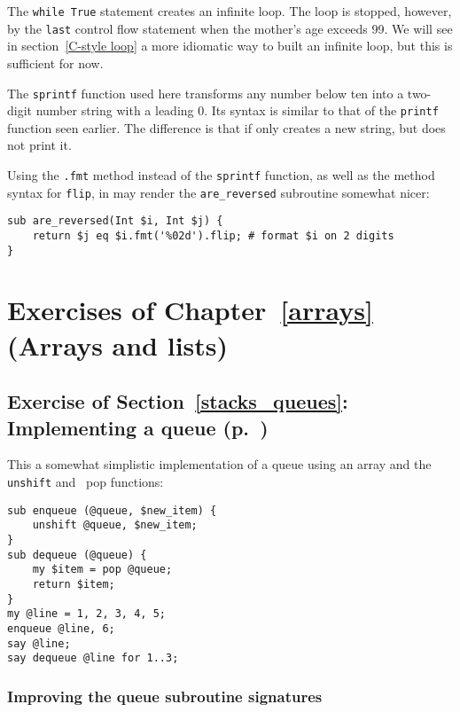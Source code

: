 The {\tt while True} statement creates an infinite loop. The 
loop is stopped, however, by the {\tt last} control flow 
statement when the mother's age exceeds 99. We will see 
in section~\ref{C-style loop} a more idiomatic way to built 
an infinite loop, but this is sufficient for now.

The {\tt sprintf} function used here transforms any number 
below ten into a two-digit number string with a leading 0. 
Its syntax is similar to that of the {\tt printf} function 
seen earlier. The difference is that if only creates a new 
string, but does not print it.

Using the \verb'.fmt' method instead of the {\tt sprintf} 
function, as well as the method syntax for {\tt flip}, in 
may render the \verb'are_reversed' subroutine somewhat  
nicer:

\begin{verbatim}
sub are_reversed(Int $i, Int $j) {
    return $j eq $i.fmt('%02d').flip; # format $i on 2 digits
}
\end{verbatim}


\section{Exercises of Chapter~\ref{arrays} (Arrays and lists)}

\subsection{Exercise of Section~\ref{stacks_queues}: Implementing a queue (p.~\pageref{exercise_queue})}
\label{sol_exercise_queue}

This a somewhat simplistic implementation of a queue using 
an array and the {\tt unshift} and {\ pop} functions:

\begin{verbatim}
sub enqueue (@queue, $new_item) {
    unshift @queue, $new_item;
}
sub dequeue (@queue) {
    my $item = pop @queue;
    return $item;
}
my @line = 1, 2, 3, 4, 5;
enqueue @line, 6;
say @line;
say dequeue @line for 1..3;
\end{verbatim}

\subsubsection{Improving the queue subroutine signatures}

